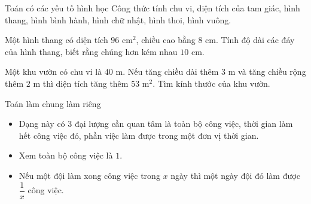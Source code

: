\begin{dang}{Toán có các yếu tố hình học}
	Công thức tính chu vi, diện tích của tam giác, hình thang, hình bình hành, hình chữ nhật, hình thoi, hình vuông.
\end{dang}
\begin{bt}
	Một hình thang có diện tích $96$ cm$^2$, chiều cao bằng $8$ cm. Tính độ dài các đáy của hình thang, biết rằng chúng hơn kém nhau $10$ cm.
\end{bt}
\begin{bt}
	Một khu vườn có chu vi là $40$ m. Nếu tăng chiều dài thêm $3$ m và tăng chiều rộng thêm $2$ m thì diện tích tăng thêm $53$ m$^2$. Tìm kính thước của khu vườn.
\end{bt}
\begin{dang}{Toán làm chung làm riêng}
	\begin{itemize}
		\item Dạng này có $3$ đại lượng cần quan tâm là toàn bộ công việc, thời gian làm hết công việc đó, phần việc làm được trong một đơn vị thời gian.
		\item Xem toàn bộ công việc là $1$.
		\item Nếu một đội làm xong công việc trong $x$ ngày thì một ngày đội đó làm được $\dfrac{1}{x}$ công việc.
	\end{itemize}
\end{dang}
